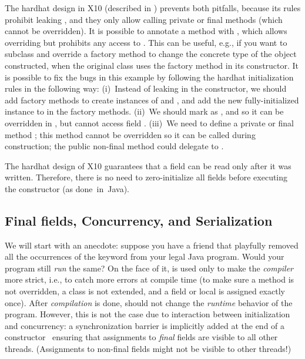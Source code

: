 The hardhat design in X10 (described in )
    prevents both pitfalls,
    because its rules prohibit leaking \this,
    and they only allow calling private or final methods (which cannot be overridden).
It is possible to annotate a method with ,
    which allows overriding but prohibits any access to \this.
This can be useful, e.g., if you want to subclass and override a factory method
    to change the concrete type of the object constructed,
    when the original class uses the factory method in its constructor.
It is possible to fix the bugs in this example by following the hardhat initialization rules
    in the following way:
    (i)~Instead of leaking \this in the constructor,
        we should add factory methods to create instances of  and ,
        and add the new fully-initialized instance to  in the factory methods.
    (ii)~We should mark  as ,
        and so it can be overridden in , but cannot access field .
    (iii)~We need to define a private or final method ;
        this method cannot be overridden so it can be called during construction;
        the public non-final method  could delegate to .

The hardhat design of X10 guarantees that a field can be read only after it was written.
Therefore, there is no need to zero-initialize all fields before executing the constructor (as done~in~Java).


\subsection{Final fields, Concurrency, and Serialization}
\label{Section:FinalFields}
We will start with an anecdote:
    suppose you have a friend that
    playfully removed all the occurrences of the  keyword
    from your legal Java program.
Would your program still \emph{run} the same?
On the face of it,  is used only to make the \emph{compiler} more {strict},
    i.e., to catch more errors at compile time
    (to make sure a method is not overridden, a class is not extended, and a field or local
        is assigned exactly once).
After \emph{compilation} is done,  should not change the \emph{runtime} behavior of the program.
However, this is not the case due to interaction between initialization and concurrency:
    a synchronization barrier is implicitly added
    at the end of a constructor~\cite{JSR133}
    ensuring that assignments to \emph{final} fields are visible to all other threads.
(Assignments to non-final fields might not be visible to other threads!)

